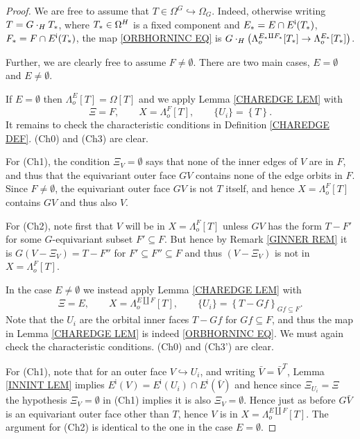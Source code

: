 \documentclass[a4paper,10pt,draft]{article}%
\numberwithin{equation}{section}%
\numberwithin{figure}{section}
\begin{document}
\begin{proof}
We are free to assume that $T \in \Omega^G \hookrightarrow \Omega_G$. Indeed, otherwise writing $T = G \cdot_H T_{\**}$, where $T_{\**} \in \Omega^H$ is a fixed component and 
$E_{\**}=E \cap E^{\mathsf{i}}(T_{\**})$, $F_{\**} = F \cap E^{\mathsf{i}}(T_{\**})$,
the map \eqref{ORBHORNINC EQ} is
$G \cdot_H 
\left( \Lambda_o^{E_{\**} \amalg F_{\**}}[T_{\**}] \to \Lambda_o^{E_{\**}}[T_{\**}]\right)$.

Further, we are clearly free to assume $F \neq \emptyset$.
There are two main cases, 
$E=\emptyset$ and $E\neq \emptyset$.

If $E=\emptyset$ then $\Lambda_o^{E}[T] = \Omega[T]$ and we apply
Lemma \ref{CHAREDGE LEM}
	with 
\[
	\Xi = F, \qquad 
	X=\Lambda_o^{F}[T], \qquad
	\{U_i\}=\left\{T\right\}.
\]
It remains to check the characteristic conditions in Definition \ref{CHAREDGE DEF}.
	(Ch0) and (Ch3) are clear.

	For (Ch1), the condition $\Xi_{V} = \emptyset$
	says that none of the inner edges of $V$ are in $F$,
	and thus that the equivariant outer face $G V$ contains none of the edge orbits in $F$. Since $F\neq \emptyset$, the equivariant outer face $GV$ is not $T$ itself, 
	and hence $X=\Lambda_o^{F}[T]$ contains $G V$ and thus also $V$.

	For (Ch2), note first that $V$ will be in $X=\Lambda_o^{F}[T]$
	unless $GV$ has the form $T - F'$ for some $G$-equivariant subset $F' \subseteq F$. But hence by Remark \ref{GINNER REM} it is
	$G(V-\Xi_V) = T - F''$ for $F'\subseteq F'' \subseteq F$ and thus $(V-\Xi_V)$ is not in $X=\Lambda_o^{F}[T]$.

	In the case $E \neq \emptyset$ we instead apply Lemma \ref{CHAREDGE LEM} with
\[
	\Xi = E, \qquad X=\Lambda_o^{E\amalg F}[T], \qquad
	\{U_i\}=\left\{T - Gf\right\}_{Gf \subseteq F}.
\]
Note that the $U_i$ are the orbital inner faces $T - Gf$ for $Gf \subseteq F$, and thus the map
in Lemma \ref{CHAREDGE LEM} is indeed \eqref{ORBHORNINC EQ}.
We must again check the characteristic conditions. (Ch0) and (Ch3') are clear.

	For (Ch1), note that for an outer face 
	$V \hookrightarrow U_i$, and writing $\bar{V} = \bar{V}^T$,
	Lemma \ref{INNINT LEM} implies
	$E^{\mathsf{i}}(V) = E^{\mathsf{i}}(U_i) \cap E^{\mathsf{i}}(\bar{V})$
	and hence since $\Xi_{U_i}=\Xi$ the 
	hypothesis $\Xi_{V} = \emptyset$ in (Ch1) implies it is also
	$\Xi_{V} = \emptyset$.
	Hence just as before $G\bar{V}$ is an equivariant outer face other than $T$, hence $V$ is in $X=\Lambda_o^{E\amalg F}[T]$.
	The argument for (Ch2) is identical to the one in the case
	$E=\emptyset$.
\end{proof}
\end{document}
